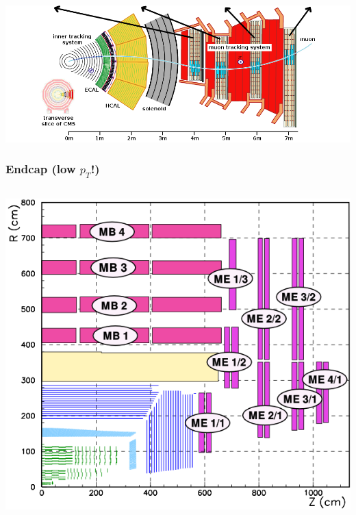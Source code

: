 \documentclass[compress]{beamer}
\begin{document}
\begin{frame}
\includegraphics[width=\linewidth]{cms_slice.png}
\end{frame}

\begin{frame}
\frametitle{Endcap  (low $p_T$!)}

\begin{columns}
\includegraphics[width=\linewidth]{muon_system.png}

\end{columns}
\end{frame}
\end{document}

